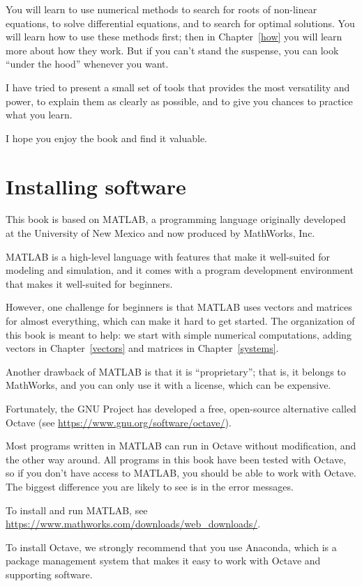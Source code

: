 \documentclass[main.tex]{subfiles}
\begin{document}
You will learn to use numerical methods to search for roots of non-linear equations, to solve differential equations, and to search for optimal solutions.  You will learn how to use these methods first; then in Chapter~\ref{how} you will learn more about how they work.  But if you can't stand the suspense, you can look ``under the hood'' whenever you want.

I have tried to present a small set of tools that provides the most versatility and power, to explain them as clearly as possible, and to give you chances to practice what you learn.

I hope you enjoy the book and find it valuable.


\section*{Installing software}

This book is based on MATLAB, a programming language originally developed at the University of New Mexico and now produced by MathWorks, Inc.  

MATLAB is a high-level language with features that make it well-suited for modeling and simulation, and it comes with a program development environment that makes it well-suited for beginners.

However, one challenge for beginners is that MATLAB uses vectors and matrices for almost everything, which can make it hard to get started.  The organization of this book is meant to help: we start with simple numerical computations, adding vectors in Chapter~\ref{vectors} and matrices in Chapter~\ref{systems}.

Another drawback of MATLAB is that it is ``proprietary''; that is, it belongs to MathWorks, and you can only use it with a license, which can be expensive.

Fortunately, the GNU Project has developed a free, open-source alternative called Octave (see \url{https://www.gnu.org/software/octave/}).  

Most programs written in MATLAB can run in Octave without modification, and the other way around.  All programs in this book have been tested with Octave, so if you don't have access to MATLAB, you should be able to work with Octave.  The biggest difference you are likely to see is in the error messages.

To install and run MATLAB, see \url{https://www.mathworks.com/downloads/web_downloads/}.

To install Octave, we strongly recommend that you use Anaconda, which is a package management system that makes it easy to work with Octave and supporting software.
\end{document}
